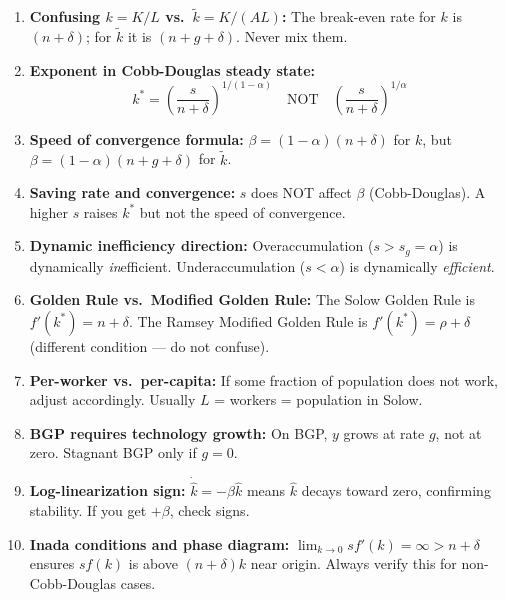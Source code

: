 \documentclass[a4paper,11pt]{article}
\newcommand{\ktilde}{\tilde{k}}
\begin{document}
\begin{enumerate}[label=\textbf{P\arabic*.}]

    \item \textbf{Confusing $k = K/L$ vs.\ $\ktilde = K/(AL)$:}
    The break-even rate for $k$ is $(n+\delta)$; for $\ktilde$ it is $(n+g+\delta)$. Never mix them.

    \item \textbf{Exponent in Cobb-Douglas steady state:}
    \[
    k^* = \left(\frac{s}{n+\delta}\right)^{1/(1-\alpha)} \quad \text{NOT} \quad \left(\frac{s}{n+\delta}\right)^{1/\alpha}
    \]

    \item \textbf{Speed of convergence formula:}
    $\beta = (1-\alpha)(n+\delta)$ for $k$, but $\beta = (1-\alpha)(n+g+\delta)$ for $\ktilde$.

    \item \textbf{Saving rate and convergence:}
    $s$ does NOT affect $\beta$ (Cobb-Douglas). A higher $s$ raises $k^*$ but not the speed of convergence.

    \item \textbf{Dynamic inefficiency direction:}
    Overaccumulation ($s > s_g = \alpha$) is dynamically \emph{in}efficient. Underaccumulation ($s < \alpha$) is dynamically \emph{efficient}.

    \item \textbf{Golden Rule vs.\ Modified Golden Rule:}
    The Solow Golden Rule is $f'(k^*) = n+\delta$. The Ramsey Modified Golden Rule is $f'(k^*) = \rho + \delta$ (different condition — do not confuse).

    \item \textbf{Per-worker vs.\ per-capita:}
    If some fraction of population does not work, adjust accordingly. Usually $L$ = workers = population in Solow.

    \item \textbf{BGP requires technology growth:}
    On BGP, $y$ grows at rate $g$, not at zero. Stagnant BGP only if $g=0$.

    \item \textbf{Log-linearization sign:}
    $\dot{\hat{k}} = -\beta \hat{k}$ means $\hat{k}$ decays toward zero, confirming stability. If you get $+\beta$, check signs.

    \item \textbf{Inada conditions and phase diagram:}
    $\lim_{k\to 0} sf'(k) = \infty > n+\delta$ ensures $sf(k)$ is above $(n+\delta)k$ near origin. Always verify this for non-Cobb-Douglas cases.

\end{enumerate}
\end{document}
